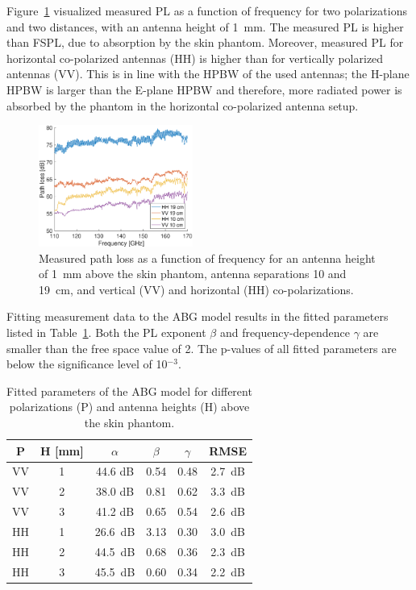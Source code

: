\documentclass[preprint]{rsl}
\begin{document}
Figure~\ref{fig:PL_vs_freq} visualized measured PL as a function of frequency for two polarizations and two distances, with an antenna height of 1~mm.
The measured PL is higher than FSPL, due to absorption by the skin phantom.
Moreover, measured PL for horizontal co-polarized antennas (HH) is higher than for vertically polarized antennas (VV).
This is in line with the HPBW of the used antennas; the H-plane HPBW is larger than the E-plane HPBW and therefore, more radiated power is absorbed by the phantom in the horizontal co-polarized antenna setup.
\begin{figure}[b!]
\begin{center}
	\includegraphics[width=0.45\textwidth]{figures/PL_vs_freq}
\caption{Measured path loss as a function of frequency for an antenna height of 1~mm above the skin phantom, antenna separations 10 and 19~cm, and vertical (VV) and horizontal (HH) co-polarizations.}
\label{fig:PL_vs_freq}
\end{center}
\end{figure}

Fitting measurement data to the ABG model results in the fitted parameters listed in Table~\ref{table:ABG}. 
Both the PL exponent $\beta$ and frequency-dependence $\gamma$ are smaller than the free space value of 2. 
The p-values of all fitted parameters are below the significance level of 10$^{-3}$. 
\begin{table}[tb]
  \caption{Fitted parameters of the ABG model for different polarizations (P) and antenna heights (H) above the skin phantom.}
  \label{table:ABG}
  \begin{center}
    \begin{tabular}{cc|cccc}
      P & H [mm] & $\alpha$ & $\beta$ & $\gamma$ & RMSE \\
      \hline
      VV & 1 & 44.6 dB & 0.54 & 0.48 & 2.7~dB \\
      VV & 2 & 38.0 dB & 0.81 & 0.62 & 3.3~dB \\
      VV & 3 & 41.2 dB & 0.65 & 0.54 & 2.6~dB \\
      HH & 1 & 26.6~dB & 3.13 & 0.30 & 3.0~dB \\
      HH & 2 & 44.5~dB & 0.68 & 0.36 & 2.3~dB \\
      HH & 3 & 45.5~dB & 0.60 & 0.34 & 2.2~dB \\
    \end{tabular}
  \end{center}
\end{table}
\end{document}

